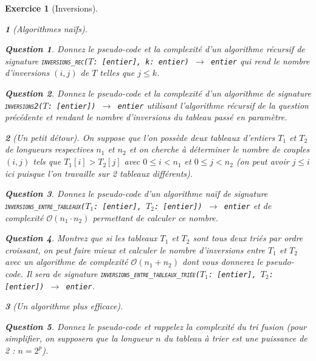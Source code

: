 \documentclass{article}
\theoremstyle{exostyle}
\newtheorem{exo}{Exercice}
\theoremstyle{partiestyle}
\newtheorem{partie}{}[exo]
\theoremstyle{questionstyle}
\newtheorem{questionpartie}{Question}[partie]
\begin{document}
\begin{exo}[Inversions]
\begin{partie}[Algorithmes naïfs]
        \begin{questionpartie}
            Donnez le pseudo-code et la complexité d'un algorithme récursif de signature \texttt{\textsc{inversions\_rec}($T$: [entier], k: entier) $\rightarrow$ entier} qui rend le nombre d'inversions $(i, j)$ de $T$ telles que $j \leq k$.
        \end{questionpartie}
        \begin{questionpartie}
            Donnez le pseudo-code et la complexité d'un algorithme de signature \texttt{\textsc{inversions2}($T$: [entier]) $\rightarrow$ entier} utilisant l'algorithme récursif de la question précédente et rendant le nombre d'inversions du tableau passé en paramètre.
        \end{questionpartie}

    \end{partie}
    \begin{partie}[Un petit détour]
        On suppose que l'on possède deux tableaux d'entiers $T_1$ et $T_2$ de longueurs respectives $n_1$ et $n_2$ et on cherche à déterminer le nombre de couples $(i, j)$ tels que $T_1[i] > T_2[j]$ avec $0 \leq i < n_1$ et $0 \leq j < n_2$ (on peut avoir $j \leq i$ ici puisque l'on travaille sur 2 tableaux différents). 
        \begin{questionpartie}
            Donnez le pseudo-code d'un algorithme naïf de signature \texttt{\textsc{inversions\_entre\_tableaux}($T_1$: [entier], $T_2$: [entier]) $\rightarrow$ entier} et de complexité $\mathcal{O}(n_1 \cdot n_2)$ permettant de calculer ce nombre.
        \end{questionpartie}
        \begin{questionpartie}
            Montrez que si les tableaux $T_1$ et $T_2$ sont tous deux triés par ordre croissant, on peut faire mieux et calculer le nombre d'inversions entre $T_1$ et $T_2$ avec un algorithme de complexité $\mathcal{O}(n_1 + n_2)$ dont vous donnerez le pseudo-code. Il sera de signature \texttt{\textsc{inversions\_entre\_tableaux\_triée}($T_1$: [entier], $T_2$: [entier]) $\rightarrow$ entier}.
        \end{questionpartie}
    \end{partie}
    \begin{partie}[Un algorithme plus efficace]
        ~\vspace*{-.5cm}
        \begin{questionpartie}
            Donnez le pseudo-code et rappelez la complexité du tri fusion (pour simplifier, on supposera que la longueur $n$ du tableau à trier est une puissance de 2 : $n = 2^p$).

\end{questionpartie}
\end{partie}
\end{exo}
\end{document}
